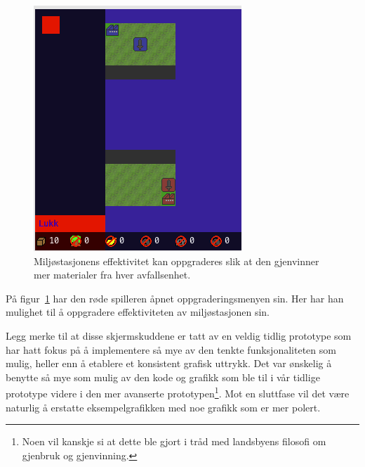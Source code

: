 \begin{figure} [H]
\centering
\includegraphics{images/OppgradereEnv.png}
\caption{Miljøstasjonens effektivitet kan oppgraderes slik at den gjenvinner mer materialer fra hver avfallsenhet.}
\label{fig:OppgradereEnv}
\end{figure}

På figur~\ref{fig:OppgradereEnv} har den røde spilleren åpnet
oppgraderingsmenyen sin. Her har han mulighet til å oppgradere
effektiviteten av miljøstasjonen sin.

Legg merke til at disse skjermskuddene er tatt av en veldig tidlig
prototype som har hatt fokus på å implementere så mye av den tenkte
funksjonaliteten som mulig, heller enn å etablere et konsistent grafisk
uttrykk. Det var ønskelig å benytte så mye som mulig av den kode og
grafikk som ble til i vår tidlige prototype videre i den mer avanserte
prototypen\footnote{Noen vil kanskje si at dette ble gjort i tråd med
landsbyens filosofi om gjenbruk og gjenvinning.}. Mot en sluttfase vil
det være naturlig å erstatte eksempelgrafikken med noe grafikk som er
mer polert.

